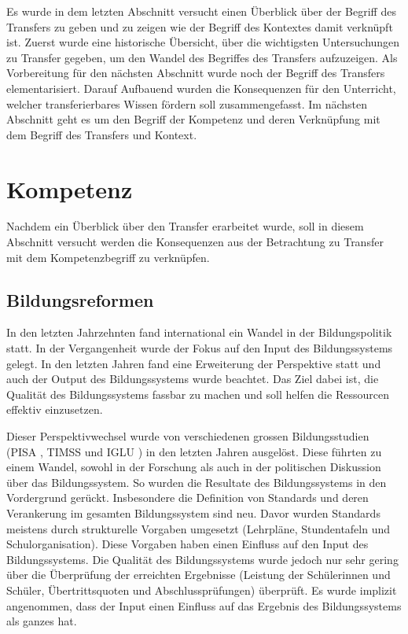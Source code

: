 Es wurde in dem letzten Abschnitt versucht einen Überblick über der Begriff des Transfers zu geben und zu zeigen wie der Begriff des Kontextes damit verknüpft ist. Zuerst wurde eine historische Übersicht, über die wichtigsten Untersuchungen zu Transfer gegeben, um den Wandel des Begriffes des Transfers aufzuzeigen.  Als Vorbereitung für den nächsten Abschnitt wurde noch der Begriff des Transfers elementarisiert. Darauf Aufbauend wurden die Konsequenzen für den Unterricht, welcher transferierbares Wissen fördern soll zusammengefasst. Im nächsten Abschnitt geht es um den Begriff der Kompetenz und deren Verknüpfung mit dem Begriff des Transfers und Kontext.


\section{Kompetenz}

Nachdem ein Überblick über den Transfer erarbeitet wurde, soll in diesem Abschnitt versucht werden die Konsequenzen aus der Betrachtung zu Transfer mit dem Kompetenzbegriff zu verknüpfen.

\subsection{Bildungsreformen}
In den letzten Jahrzehnten fand international ein Wandel in der Bildungspolitik statt. In der Vergangenheit wurde der Fokus auf den Input des Bildungssystems gelegt. In den letzten Jahren fand eine Erweiterung der Perspektive statt und auch der Output des Bildungssystems wurde beachtet. Das Ziel dabei ist, die Qualität des Bildungssystems fassbar zu machen und soll helfen die Ressourcen effektiv einzusetzen.

Dieser Perspektivwechsel wurde von verschiedenen grossen Bildungsstudien (PISA \citep{PISA-KonsortiumDeuschland2004}, TIMSS \citep{Martin2003} und IGLU \citep{Bos2003}) in den letzten Jahren ausgelöst. Diese führten zu einem Wandel, sowohl in der Forschung als auch in der politischen Diskussion über das Bildungssystem. So wurden die Resultate des Bildungssystems in den Vordergrund gerückt. Insbesondere die Definition von Standards und deren Verankerung im gesamten Bildungssystem sind neu. Davor wurden Standards meistens durch strukturelle Vorgaben umgesetzt (Lehrpläne, Stundentafeln und Schulorganisation). Diese Vorgaben haben einen Einfluss auf den Input des Bildungssystems. Die Qualität des Bildungssystems wurde jedoch nur sehr gering über die Überprüfung der erreichten Ergebnisse (Leistung der Schülerinnen und Schüler, Übertrittsquoten und Abschlussprüfungen) überprüft. Es wurde implizit angenommen, dass der Input einen Einfluss auf das Ergebnis des Bildungssystems als ganzes hat. 

